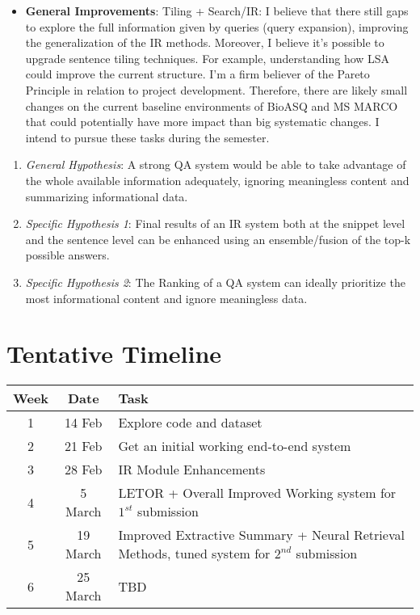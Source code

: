 \documentclass{article}
\begin{document}
\begin{itemize}
    \item \textbf{General Improvements}: Tiling + Search/IR: I believe that there still gaps to explore the full information given by queries (query expansion), improving the generalization of the IR methods. Moreover, I believe it's possible to upgrade sentence tiling techniques. For example, understanding how LSA could improve the current structure. I'm a firm believer of the Pareto Principle in relation to project development. Therefore, there are likely small changes on the current baseline environments of BioASQ and MS MARCO that could potentially have more impact than big systematic changes. I intend to pursue these tasks during the semester. 
    
\end{itemize}

\begin{enumerate}
\item[]\textit{General Hypothesis}: A strong QA system would be able to take advantage of the whole available information adequately, ignoring meaningless content and summarizing informational data.

\item[]\textit{Specific Hypothesis 1}: Final results of an IR system both at the snippet level and the sentence level can be enhanced using an ensemble/fusion of the top-k possible answers.

\item[]\textit{Specific Hypothesis 2}: The Ranking of a QA system can ideally prioritize the most informational content and ignore meaningless data.

\end{enumerate}

\pagebreak

\section{Tentative Timeline}

\begin{table}[H]
    \centering
        
    \begin{tabular}{|c|c|l|} \hline
        \textbf{Week} & \textbf{Date}   & \textbf{Task} \\ \hline
        1    & 14 Feb & Explore code and dataset \\
        2    & 21 Feb & Get an initial working end-to-end system \\ %
        3    & 28 Feb & IR Module Enhancements \\
        4    & 5 March & LETOR + Overall Improved Working system for $1^{st}$ submission \\
        5    & 19 March & Improved Extractive Summary + Neural Retrieval Methods, tuned system for $2^{nd}$ submission \\
        6    & 25 March & TBD \\ \hline
    \end{tabular}

\end{table}



\end{document}

